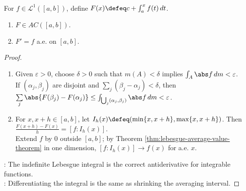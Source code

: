 \begin{theorem} \label{thm:lebesgue-antiderivative-theorem} \\
For $f\in\mathscr{L}^1([a,b])$, define $F(x)\defeq c+\int_a^x f(t)\,dt$.
\begin{enumerate}[label=(\roman*)]
\setlength{\itemsep}{0pt}
\item $F\in AC([a,b])$.
\item $F'=f$ a.e. on $[a,b]$.
\end{enumerate}
\begin{proof}
\begin{enumerate}[label=(\roman*)]
\setlength{\itemsep}{0pt}
\item Given $\varepsilon>0$, choose $\delta>0$ such that $m(A)<\delta$ implies $\int_A\abs f\,dm<\varepsilon$.\\
If $(\alpha_j,\beta_j)$ are disjoint and $\sum\limits_j(\beta_j-\alpha_j)<\delta$, then $\sum\limits_j\abs{F(\beta_j)-F(\alpha_j)}\leq\int_{\bigcup_j(\alpha_j,\beta_j)}\abs f\,dm<\varepsilon$.
\item For $x,x+h\in[a,b]$, let $I_h(x)\defeq(\min\{x,x+h\},\max\{x,x+h\})$. Then $\frac{F(x+h)-F(x)}{h}=[f:I_h(x)]$.\\
Extend $f$ by $0$ outside $[a,b]$; by Theorem \ref{thm:lebesgue-average-value-theorem} in one dimension, $[f:I_h(x)]\to f(x)$ for a.e. $x$.
\end{enumerate}
: The indefinite Lebesgue integral is the correct antiderivative for integrable functions.\\
: Differentiating the integral is the same as shrinking the averaging interval.
\end{proof}
\end{theorem}
